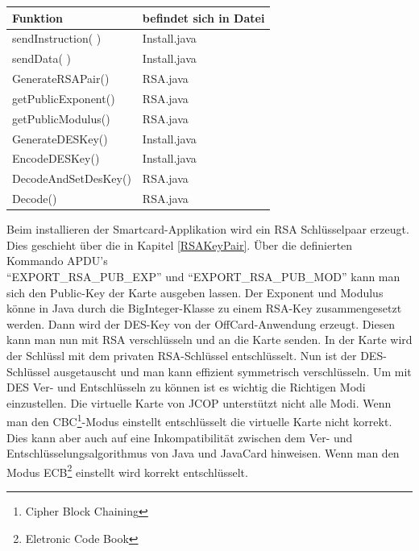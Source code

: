 \documentclass[parskip]{scrartcl}
\begin{document}
		\begin{table}[H]
			\centering
			\begin{tabular}[c]{|l|l|}
				\hline Funktion & befindet sich in Datei \\ 
				\hline
				\hline sendInstruction( ) & Install.java \\ 
				\hline sendData( ) & Install.java \\ 
				\hline GenerateRSAPair()  & RSA.java \\ 
				\hline getPublicExponent() & RSA.java \\ 
				\hline getPublicModulus() & RSA.java \\ 
				\hline GenerateDESKey() & Install.java \\ 
				\hline EncodeDESKey() & Install.java \\
				\hline DecodeAndSetDesKey() & RSA.java \\
				\hline Decode() & RSA.java \\
				\hline 
			\end{tabular} 
		\end{table}
		
		\newpage
		Beim installieren der Smartcard-Applikation wird ein RSA Schlüsselpaar erzeugt. Dies geschieht über die in Kapitel \ref{RSAKeyPair}. Über die definierten Kommando APDU's \\\enquote{EXPORT\_RSA\_PUB\_EXP} und \enquote{EXPORT\_RSA\_PUB\_MOD} kann man sich den Pub\-lic-Key der Karte ausgeben lassen. Der Exponent und Modulus könne in Java durch die BigInteger-Klasse zu einem RSA-Key zusammengesetzt werden. Dann wird der DES-Key von der OffCard-Anwendung erzeugt. Diesen kann man nun mit RSA verschlüsseln und an die Karte senden. In der Karte wird der Schlüssl mit dem privaten RSA-Schlüssel entschlüsselt. Nun ist der DES-Schlüssel ausgetauscht und man kann effizient symmetrisch verschlüsseln. Um mit DES Ver- und Entschlüsseln zu können ist es wichtig die Richtigen Modi einzustellen. Die virtuelle Karte von JCOP unterstützt nicht alle Modi. Wenn man den CBC\footnote{Cipher Block Chaining}-Modus einstellt entschlüsselt die virtuelle Karte nicht korrekt. Dies kann aber auch auf eine Inkompatibilität zwischen dem Ver- und Entschlüsselungsalgorithmus von Java und JavaCard hinweisen. Wenn man den Modus ECB\footnote{Eletronic Code Book} einstellt wird korrekt entschlüsselt. 
\end{document}
